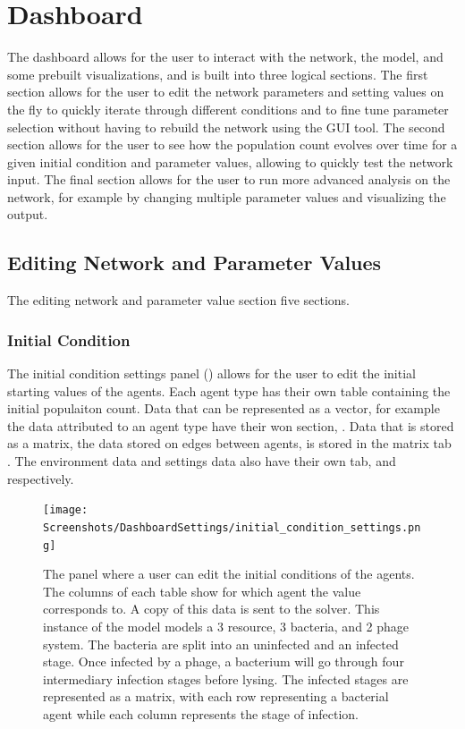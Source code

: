 \section{Dashboard}
The dashboard allows for the user to interact with the network, the model, and some prebuilt visualizations, and is built into three logical sections. 
The first section allows for the user to edit the network parameters and setting values on the fly to quickly iterate through different conditions and to fine tune parameter selection without having to rebuild the network using the GUI tool. 
The second section allows for the user to see how the population count evolves over time for a given initial condition and parameter values, allowing to quickly test the network input. 
The final section allows for the user to run more advanced analysis on the network, for example by changing multiple parameter values and visualizing the output. 


\subsection{Editing Network and Parameter Values}
\label{sec:editing_network_and_parameter_values}
The editing network and parameter value section five sections. 
\subsubsection{Initial Condition}
The initial condition settings panel () allows for the user to edit the initial starting values of the agents. 
Each agent type has their own table containing the initial populaiton count. 
Data that can be represented as a vector, for example the data attributed to an agent type have their won section, . 
Data that is stored as a matrix, the data stored on edges between agents, is stored in the matrix tab . 
The environment data and settings data also have their own tab,  and  respectively. 

\begin{figure}
    \centering
    \texttt{[image: Screenshots/DashboardSettings/initial\_condition\_settings.png]}
    \caption{
        The panel where a user can edit the initial conditions of the agents. 
        The columns of each table show for which agent the value corresponds to. 
        A copy of this data is sent to the solver. 
        This instance of the model models a 3 resource, 3 bacteria, and 2 phage system. 
        The bacteria are split into an uninfected and an infected stage. 
        Once infected by a phage, a bacterium will go through four intermediary infection stages before lysing. 
        The infected stages are represented as a matrix, with each row representing a bacterial agent while each column represents the stage of infection. 
    }
    \label{fig:ss:ds:initial_condition}
\end{figure}

